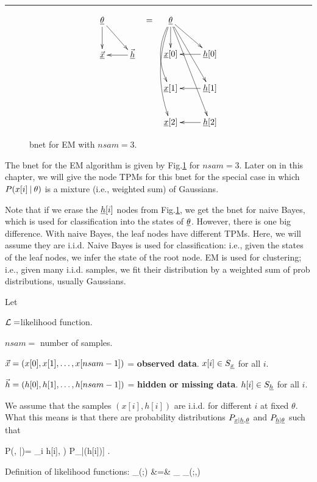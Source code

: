 \hrule


\begin{figure}[h!]
\centering
$$\begin{array}{ccc}
\xymatrix{
\ul{\theta}\ar[d]\ar[dr]
\\
\ul{\vecx}&\ul{\vech}\ar[l]
}
&=&
\xymatrix{
\ul{\theta}
\ar[d]
\ar@/_1pc/[dd]
\ar@/_1pc/[ddd]
\ar[rd]\ar[rdd]\ar[rddd]
\\
\rvx[0]
&\rvh[0]\ar[l]
\\
\rvx[1]
&\rvh[1]\ar[l]
\\
\rvx[2]
&\rvh[2]\ar[l]
}
\end{array}
$$
\caption{bnet for EM with $nsam=3$.}
\label{fig-em-bnet}
\end{figure}


The bnet for the EM algorithm
is given by Fig.\ref{fig-em-bnet}
for $nsam=3$.
Later on in this chapter,
we will give the node TPMs
for this bnet for
the special
case in which $P(x[i]{\:\mathbf{|}\:} \theta)$
is a mixture (i.e., weighted sum)
of Gaussians.

Note that if we 
erase the ${\underline{h}}[i]$ nodes
from Fig.\ref{fig-em-bnet},
we get the bnet for naive Bayes,
which is used for classification
into the states of $\underline{\theta}$.
However, there is one big
difference. 
With naive Bayes,
the leaf nodes have
different TPMs.
Here, we will assume they are i.i.d.
Naive Bayes is used for classification: i.e., 
given the states 
of the leaf nodes,
we infer the state of the root node.
EM is used for clustering; i.e.,
given many i.i.d. samples,
we fit their distribution by a weighted sum
of prob distributions,
usually Gaussians.

Let
 
${\cal L}=$likelihood 
function.

$nsam=$ number of samples.

${\vec{x}}=(x[0], x[1], \ldots, x[nsam-1])$ =
{\bf observed data}.
 $x[i]\in S_{\underline{x}}$ for all $i$.

${\vec{h}}=(h[0], h[1], \ldots, h[nsam-1])$
= {\bf hidden or missing data}.
$h[i]\in S_{\underline{h}}$ for all $i$.

We assume that the samples $(x[i],h[i])$
are i.i.d. for different $i$ at fixed 
$\theta$.
What this means is that 
there are
probability distributions
$P_{{\underline{x}}|{\underline{h}},\underline{\theta}}$
and $P_{{\underline{h}}|\underline{\theta}}$
such that

\beq
P(\vecx, \vech|\theta)=
\prod_i \left[P_{\rvx|\rvh,\ul{\theta}}
(x[i]\cond h[i], \theta)
P_{\rvh|\ul{\theta}}(h[i]\cond \theta)\right]
\;.
\eeq

Definition of likelihood functions:
\beqa
{}
_{\call(\theta;\vecx)}
&=&
\sum_{\vech}
_{\call(\theta;\vecx,\vech)}
\eeqa



